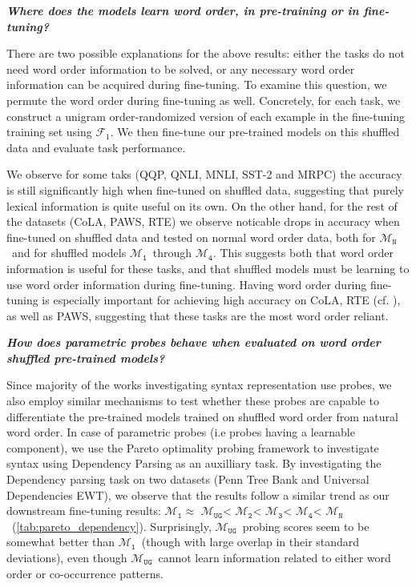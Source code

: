 \documentclass[12pt]{article}
\newcommand{\xit}[1]{{\noindent\textbf{\textit{#1}}}}
\newcommand{\OR}{$\mathcal{M}_{\texttt{N}}$}
\newcommand{\RI}{$\mathcal{M}_{\texttt{1}}$}
\newcommand{\RII}{$\mathcal{M}_{\texttt{2}}$}
\newcommand{\RIII}{$\mathcal{M}_{\texttt{3}}$}
\newcommand{\RIV}{$\mathcal{M}_{\texttt{4}}$}
\newcommand{\RC}{$\mathcal{M}_{\texttt{UG}}$}
\begin{document}
\xit{Where does the models learn word order, in pre-training or in fine-tuning?}

There are two possible explanations for the above results: either the tasks do not need word order information to be solved, or any necessary word order information can be acquired during fine-tuning.
To examine this question, we permute the word order during fine-tuning as well. Concretely, for each task, we construct a unigram order-randomized version of each example in the fine-tuning training set using $\mathcal{F}_1$. We then fine-tune our pre-trained models on this shuffled data and evaluate task performance.

We observe for some taks (QQP, QNLI, MNLI, SST-2 and MRPC) the accuracy is still significantly high when fine-tuned on shuffled data, suggesting that purely lexical information is quite useful on its own. On the other hand, for the rest of the datasets (CoLA, PAWS, RTE) we observe noticable drops in accuracy when fine-tuned on shuffled data and tested on normal word order data, both for \OR\ and for shuffled models \RI\ through \RIV.
This suggests both that word order information is useful for these tasks, and that shuffled models must be learning to use word order information during fine-tuning. Having word order during fine-tuning is especially important for achieving high accuracy on CoLA, RTE (cf. \citealt{pham2020}), as well as PAWS,
suggesting that these tasks are the most word order reliant.


\xit{How does parametric probes behave when evaluated on word order shuffled pre-trained models?}

Since majority of the works investigating syntax representation use probes, we also employ similar mechanisms to test whether these probes are capable to differentiate the pre-trained models trained on shuffled word order from natural word order. In case of parametric probes (i.e probes having a learnable component), we use the Pareto optimality probing framework \citet{pimentel2020b} to investigate syntax using Dependency Parsing as an auxilliary task. By investigating the Dependency parsing task on two datasets (Penn Tree Bank and Universal Dependencies EWT), we observe that the results follow a similar trend as our downstream fine-tuning results: \RI $\approx$ \RC < \RII < \RIII < \RIV < \OR\ (\autoref{tab:pareto_dependency}).
Surprisingly, \RC\ probing scores seem to be somewhat better than \RI\ (though with large overlap in their standard deviations), even though \RC\ cannot learn information related to either word order or co-occurrence patterns.
\end{document}
